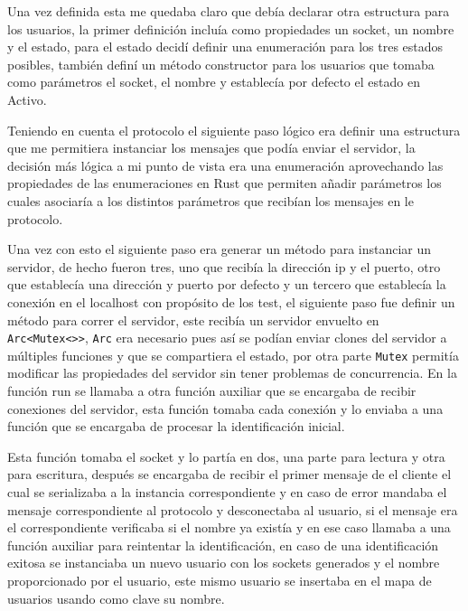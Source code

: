 \documentclass[12pt, titlepage]{article}
\begin{document}
Una vez definida esta me quedaba claro que debía declarar otra estructura para los usuarios, la primer definición incluía como propiedades un socket, un nombre y el estado, para el estado decidí definir una enumeración para los tres estados posibles, también definí un método constructor para los usuarios que tomaba como parámetros el socket, el nombre y establecía por defecto el estado en Activo.

Teniendo en cuenta el protocolo el siguiente paso lógico era definir una estructura que me permitiera instanciar los mensajes que podía enviar el servidor, la decisión más lógica a mi punto de vista era una enumeración aprovechando las propiedades de las enumeraciones en Rust que permiten añadir parámetros los cuales asociaría a los distintos parámetros que recibían los mensajes en le protocolo.

Una vez con esto el siguiente paso era generar un método para instanciar un servidor, de hecho fueron tres, uno que recibía la dirección ip y el puerto, otro que establecía una dirección y puerto por defecto y un tercero que establecía la conexión en el localhost con propósito de los test, el siguiente paso fue definir un método para correr el servidor, este recibía un servidor envuelto en \lstinline|Arc<Mutex<>>|, \lstinline|Arc| era necesario pues así se podían enviar clones del servidor a múltiples funciones y que se compartiera el estado, por otra parte \lstinline|Mutex| permitía modificar las propiedades del servidor sin tener problemas de concurrencia. En la función run se llamaba a otra función auxiliar que se encargaba de recibir conexiones del servidor, esta función tomaba cada conexión y lo enviaba a una función que se encargaba de procesar la identificación inicial.

Esta función tomaba el socket y lo partía en dos, una parte para lectura y otra para escritura, después se encargaba de recibir el primer mensaje de el cliente el cual se serializaba a la instancia correspondiente y en caso de error mandaba el mensaje correspondiente al protocolo y desconectaba al usuario, si el mensaje era el correspondiente verificaba si el nombre ya existía y en ese caso llamaba a una función auxiliar para reintentar la identificación, en caso de una identificación exitosa se instanciaba un nuevo usuario con los sockets generados y el nombre proporcionado por el usuario, este mismo usuario se insertaba en el mapa de usuarios usando como clave su nombre.
\end{document}
